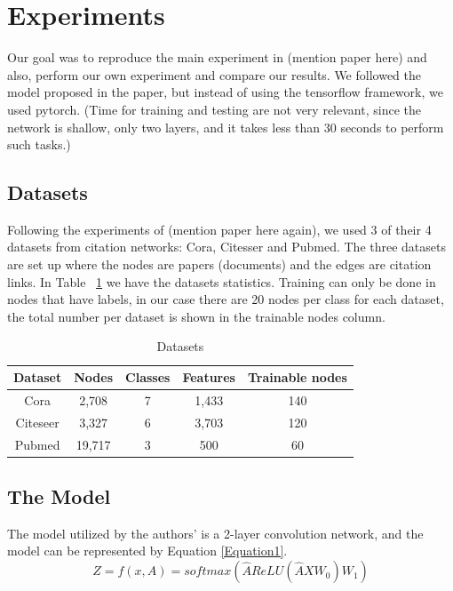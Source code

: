 \section{Experiments}
Our goal was to reproduce the main experiment in (mention paper here) and also, perform our own experiment and compare our results. We followed the model proposed in the paper, but instead of using the tensorflow framework, we used pytorch. (Time for training and testing are not very relevant, since the network is shallow, only two layers, and it takes less than 30 seconds to perform such tasks.) 

\subsection{Datasets}

Following the experiments of (mention paper here again), we used 3 of their 4 datasets from citation networks: Cora, Citesser and Pubmed. The three datasets are set up where the nodes are papers (documents) and the edges are citation links. In Table ~\ref{tab:datasets} we have the datasets statistics. Training can only be done in nodes that have labels, in our case there are 20 nodes per class for each dataset, the total number per dataset is shown in the trainable nodes column.

\begin {table}[ht]
\caption {Datasets} \label{tab:datasets} 
  \begin{center}
    \begin{tabular}{|c|c|c|c|c|}
    \hline
    Dataset  & Nodes  & Classes & Features & Trainable nodes\\
    \hline 
    Cora     & 2,708  & 7       & 1,433    & 140 \\ 
    Citeseer & 3,327  & 6       & 3,703    & 120  \\  
    Pubmed   & 19,717 & 3       & 500      & 60   \\
    \hline
    \end{tabular}
  \end{center}
\end{table}

\subsection{The Model}
The model utilized by the authors' is a 2-layer convolution network, and the model can be represented by Equation \ref{Equation1}.
\begin{equation}
    \label{Equation1}
    Z = f(x,A) = softmax(\hat{A}ReLU(\hat{A}XW_{0})W_{1}) 
\end{equation}

